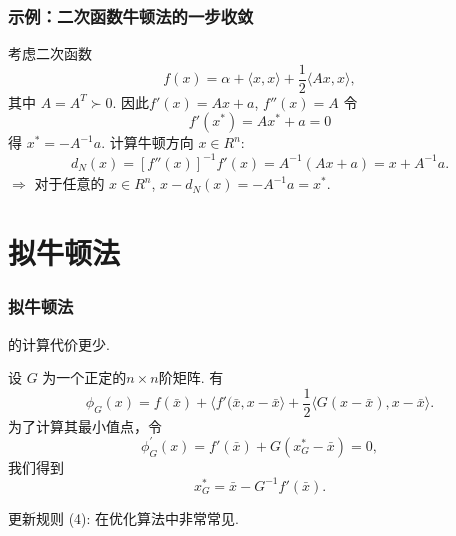 \documentclass[handout,10pt]{beamer} %
\begin{document}
\begin{frame}[fragile]
\frametitle{示例：二次函数牛顿法的一步收敛}

\begin{example}[示例]\label{eg_1_3_1}
    考虑二次函数
    $$
        f(x) = \alpha + \langle x,x\rangle + \frac{1}{2}\langle Ax,x\rangle,
    $$
    其中 $A=A_{}^{T}\succ 0$. 因此$f'(x) = Ax+a$, $f''(x) = A$ 令
    $$
        f'(x^*) = Ax^* + a = 0
    $$
    得 $x^*  = -A_{}^{-1}a$.
    计算牛顿方向   $x\in R^n$:
    $$
        d_N(x) = [f''(x)]_{}^{-1}f'(x) = A_{}^{-1}(Ax+a) = x + A_{}^{-1}a.
    $$
    $\Rightarrow$ 对于任意的 $x\in R^n$, $x-d_N(x) = - A_{}^{-1}a = x^*$.
\end{example}


\end{frame}

\section{拟牛顿法}

\begin{frame}[fragile]
\frametitle{拟牛顿法}

 的计算代价更少.


设 $G$ 为一个正定的$n\times n$阶矩阵.
有
$$
    \phi_{G}^{}(x) = f(\bar{x}) + \langle f'(\bar{x},x-\bar{x}\rangle + \frac{1}{2} \langle G(x-\bar{x}), x-\bar{x}\rangle.
$$
为了计算其最小值点，令
$$
    \phi_{G}^{\prime}(x) = f'(\bar{x}) + G(x_{G}^{*}- \bar{x}) =0,
$$
我们得到
\begin{equation}\label{EQ_1_3_1}
    x_{G}^{*} = \bar{x}-G_{}^{-1}f'(\bar{x}).
\end{equation}

更新规则 (4):
  在优化算法中非常常见.

\end{frame}
\end{document}
